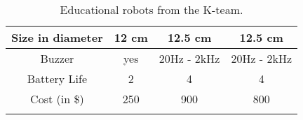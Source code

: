 \documentclass[conference]{IEEEtran}
\begin{document}
\begin{table}[t]
\begin{tabular}{cccc}
\multicolumn{1}{|c|}{Size in diameter}                                                                  & 
\multicolumn{1}{c|}{12  cm}          & \multicolumn{1}{c|}{12.5 cm}     & \multicolumn{1}{c|}{12.5 cm}     \\ \hline
\multicolumn{1}{|c|}{Buzzer}                                                                            & 
\multicolumn{1}{c|}{yes}             & \multicolumn{1}{c|}{20Hz - 2kHz} & \multicolumn{1}{c|}{20Hz - 2kHz} \\ \hline
\multicolumn{1}{|c|}{Battery Life}                                                                    & 
\multicolumn{1}{c|}{2}               & \multicolumn{1}{c|}{4}           & \multicolumn{1}{c|}{4}           \\ \hline
\multicolumn{1}{|c|}{Cost (in \$)}                                                                      & 
\multicolumn{1}{c|}{250}             & \multicolumn{1}{c|}{900}         & \multicolumn{1}{c|}{800}         \\ \hline
\multicolumn{1}{l}{}                                                                                    & 
\multicolumn{1}{l}{}                 & \multicolumn{1}{l}{}             & \multicolumn{1}{l}{}            
\end{tabular}
\caption{Educational robots from the K-team.}
\label{Hemission}
\end{table}
\end{document}
